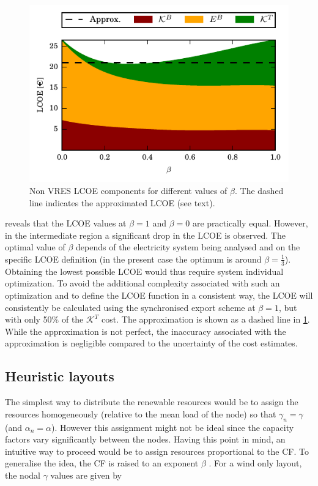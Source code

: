 \documentclass[a4paper, 5p, sort&compress]{elsarticle}%
\begin{document}
\begin{figure}[h!]
  \centering
  \includegraphics[width = \columnwidth]{constrainedSync}
  \caption{Non VRES LCOE components for different values of $\beta$. The
    dashed line indicates the approximated LCOE (see text).}
  \label{fig:transmission-lcoe}
\end{figure}

 reveals that the LCOE values at
$\beta = 1$ and $\beta = 0$ are practically equal. However, in the
intermediate region a significant drop in the LCOE is observed. The
optimal value of $\beta$ depends of the electricity system being analysed
and on the specific LCOE definition (in the present case the optimum
is around $\beta= \frac{1}{3}$). Obtaining the lowest possible LCOE would
thus require system individual optimization. To avoid the additional
complexity associated with such an optimization and to define the LCOE
function in a consistent way, the LCOE will consistently be calculated
using the synchronised export scheme at $\beta=1$, but with only 50\% of
the $\mathcal{K}^{T}$ cost. The approximation is shown as a dashed
line in \cref{fig:transmission-lcoe}. While the approximation is not
perfect, the inaccuracy associated with the approximation is
negligible compared to the uncertainty of the cost estimates.

\subsection{Heuristic layouts}
\label{sec:heuristic-layouts}

The simplest way to distribute the renewable resources would be to
assign the resources homogeneously (relative to the mean load of the
node) so that $\gamma_{n} = \gamma$ (and $\alpha_{n} = \alpha$). However this assignment
might not be ideal since the capacity factors vary significantly
between the nodes. Having this point in mind, an intuitive way to
proceed would be to assign resources proportional to the CF. To
generalise the idea, the CF is raised to an exponent $\beta$ %
\cite{Rolando}. For a wind only layout, the nodal $\gamma$ values are given by
\end{document}
